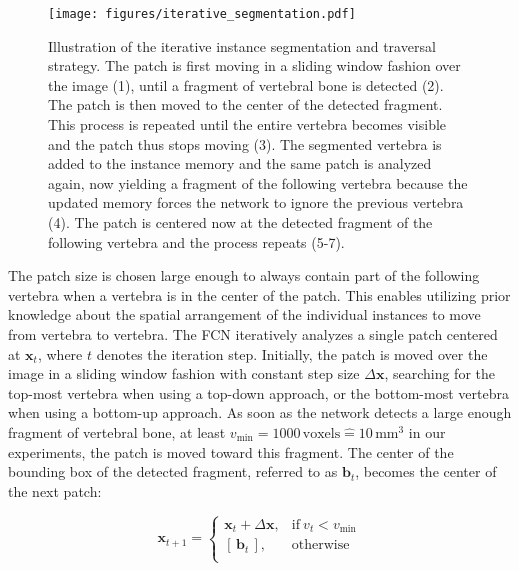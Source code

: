 \documentclass[authoryear,5p,final,times]{elsarticle}
\renewcommand{\vec}[1]{\bm{#1}}
\begin{document}
    \begin{figure*}[t]
        \centering
        \texttt{[image: figures/iterative\_segmentation.pdf]}
        \caption{Illustration of the iterative instance segmentation and traversal strategy. The patch is first moving in a sliding window fashion over the image (1), until a fragment of vertebral bone is detected (2). The patch is then moved to the center of the detected fragment. This process is repeated until the entire vertebra becomes visible and the patch thus stops moving (3). The segmented vertebra is added to the instance memory and the same patch is analyzed again, now yielding a fragment of the following vertebra because the updated memory forces the network to ignore the previous vertebra (4). The patch is centered now at the detected fragment of the following vertebra and the process repeats (5-7).}
        \label{fig:itseg}
    \end{figure*}

    The patch size is chosen large enough to always contain part of the following vertebra when a vertebra is in the center of the patch. This enables utilizing prior knowledge about the spatial arrangement of the individual instances to move from vertebra to vertebra. The FCN iteratively analyzes a single patch centered at $\vec{x}_t$, where $t$ denotes the iteration step. Initially, the patch is moved over the image in a sliding window fashion with constant step size $\Delta \vec{x}$, searching for the top-most vertebra when using a top-down approach, or the bottom-most vertebra when using a bottom-up approach. As soon as the network detects a large enough fragment of vertebral bone, at least $v_\text{min} = 1000\,\text{voxels} \mathrel{\hat{=}} 10\,\text{mm}^3$ in our experiments, the patch is moved toward this fragment. The center of the bounding box of the detected fragment, referred to as $\vec{b}_t$, becomes the center of the next patch:

    \begin{equation*}
        \vec{x}_{t+1} =
        \begin{cases}
          \vec{x}_t + \Delta \vec{x}, & \text{if}\ v_t < v_{\text{min}}\\
          [\, \vec{b}_t \,], & \text{otherwise}\\
        \end{cases}
    \end{equation*}
\end{document}
